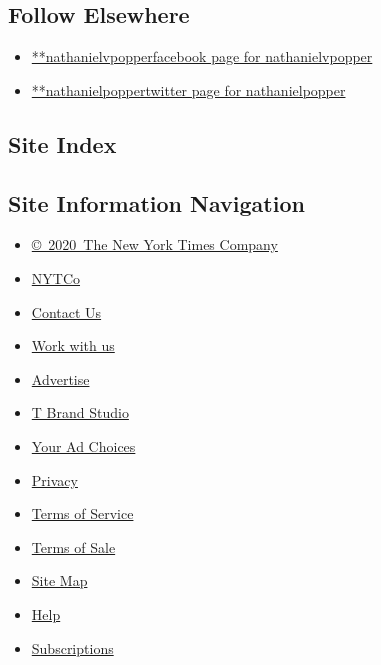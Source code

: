 \hypertarget{follow-elsewhere}{%
\subsection{Follow Elsewhere}\label{follow-elsewhere}}

\begin{itemize}
\tightlist
\item
  \href{https://www.facebookcorewwwi.onion/nathanielvpopper}{**nathanielvpopperfacebook
  page for nathanielvpopper}
\item
  \href{https://twitter.com/nathanielpopper}{**nathanielpoppertwitter
  page for nathanielpopper}
\end{itemize}

\hypertarget{site-index}{%
\subsection{Site Index}\label{site-index}}

\hypertarget{site-information-navigation}{%
\subsection{Site Information
Navigation}\label{site-information-navigation}}

\begin{itemize}
\tightlist
\item
  \href{https://help.nytimes3xbfgragh.onion/hc/en-us/articles/115014792127-Copyright-notice}{©~2020~The
  New York Times Company}
\end{itemize}

\begin{itemize}
\tightlist
\item
  \href{https://www.nytco.com/}{NYTCo}
\item
  \href{https://help.nytimes3xbfgragh.onion/hc/en-us/articles/115015385887-Contact-Us}{Contact
  Us}
\item
  \href{https://www.nytco.com/careers/}{Work with us}
\item
  \href{https://nytmediakit.com/}{Advertise}
\item
  \href{http://www.tbrandstudio.com/}{T Brand Studio}
\item
  \href{https://www.nytimes3xbfgragh.onion/privacy/cookie-policy\#how-do-i-manage-trackers}{Your
  Ad Choices}
\item
  \href{https://www.nytimes3xbfgragh.onion/privacy}{Privacy}
\item
  \href{https://help.nytimes3xbfgragh.onion/hc/en-us/articles/115014893428-Terms-of-service}{Terms
  of Service}
\item
  \href{https://help.nytimes3xbfgragh.onion/hc/en-us/articles/115014893968-Terms-of-sale}{Terms
  of Sale}
\item
  \href{https://spiderbites.nytimes3xbfgragh.onion}{Site Map}
\item
  \href{https://help.nytimes3xbfgragh.onion/hc/en-us}{Help}
\item
  \href{https://www.nytimes3xbfgragh.onion/subscription?campaignId=37WXW}{Subscriptions}
\end{itemize}
